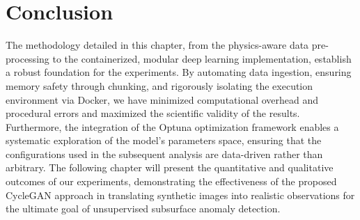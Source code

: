 \section{Conclusion}
The methodology detailed in this chapter, from the physics-aware data pre-processing to the containerized, modular deep learning implementation, establish a robust foundation for the experiments.
By automating data ingestion, ensuring memory safety through chunking, and rigorously isolating the execution environment via Docker, we have minimized computational overhead and procedural errors and maximized the scientific validity of the results.
Furthermore, the integration of the Optuna optimization framework enables a systematic exploration of the model's parameters space, ensuring that the configurations used in the subsequent analysis are data-driven rather than arbitrary.
The following chapter will present the quantitative and qualitative outcomes of our experiments, demonstrating the effectiveness of the proposed CycleGAN approach in translating synthetic images into realistic observations for the ultimate goal of unsupervised subsurface anomaly detection.

